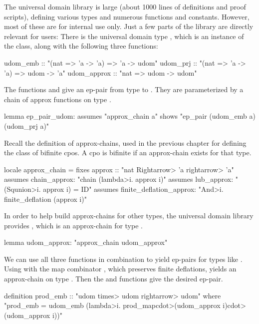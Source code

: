 The universal domain library is large (about 1000 lines of definitions and proof scripts), defining various types and numerous functions and constants. However, most of these are for internal use only. Just a few parts of the library are directly relevant for users: There is the universal domain type , which is an instance of the  class, along with the following three functions:
%
\begin{isacode}
udom_emb :: "(nat => 'a -> 'a) => 'a -> udom"
udom_prj :: "(nat => 'a -> 'a) => udom -> 'a"
udom_approx :: "nat => udom -> udom"
\end{isacode}
%
The functions  and  give an ep-pair from type  to . They are parameterized by a chain of approx functions on type .
%
\begin{isacode}
lemma ep_pair_udom:
  assumes "approx_chain a"
  shows "ep_pair (udom_emb a) (udom_prj a)"
\end{isacode}
%
Recall the definition of approx-chains, used in the previous chapter for defining the class of bifinite cpos. A cpo is bifinite if an approx-chain exists for that type.
%
\begin{isacode}
locale approx_chain =
  fixes approx :: "nat \<Rightarrow> 'a \<rightarrow> 'a"
  assumes chain_approx: "chain (\<lambda>i. approx i)"
  assumes lub_approx: "(\<Squnion>i. approx i) = ID"
  assumes finite_deflation_approx: "\<And>i. finite_deflation (approx i)"
\end{isacode}
%
In order to help build approx-chains for other types, the universal domain library provides , which is an approx-chain for type .
%
\begin{isacode}
lemma udom_approx: "approx_chain udom_approx"
\end{isacode}
%
We can use all three  functions in combination to yield ep-pairs for types like . Using  with the map combinator , which preserves finite deflations, yields an approx-chain on type . Then the  and  functions give the desired ep-pair.
%
\begin{isacode}
definition prod_emb :: "udom \<times> udom \<rightarrow> udom"
  where "prod_emb =
    udom_emb (\<lambda>i. prod_map\<cdot>(udom_approx i)\<cdot>(udom_approx i))"
\end{isacode}
